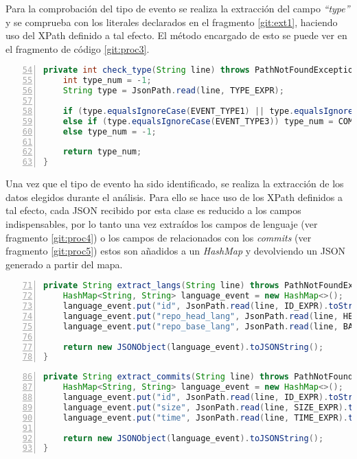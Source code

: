 Para la comprobación del tipo de evento se realiza la extracción del campo \textit{``type''} y se comprueba con los literales declarados en el fragmento \ref{git:ext1}, haciendo uso del \gls{XPath} definido a tal efecto. El método encargado de esto se puede ver en el fragmento de código \ref{git:proc3}.

\clearpage
\begin{lstlisting}[label=git:proc3,language=java,frame=single,caption={Fragmento de la clase \textit{Extractor}. Comprobación de tipo.}, firstnumber=54,numbers=left]
private int check_type(String line) throws PathNotFoundException {
	int type_num = -1;
	String type = JsonPath.read(line, TYPE_EXPR);
	
	if (type.equalsIgnoreCase(EVENT_TYPE1) || type.equalsIgnoreCase(EVENT_TYPE2)) type_num = LANG_TYPE;
	else if (type.equalsIgnoreCase(EVENT_TYPE3)) type_num = COMMIT_TYPE;
	else type_num = -1;
	
	return type_num;
}
\end{lstlisting}

Una vez que el tipo de evento ha sido identificado, se realiza la extracción de los datos elegidos durante el análisis. Para ello se hace uso de los \gls{XPath} definidos a tal efecto, cada \gls{JSON} recibido por esta clase es reducido a los campos indispensables, por lo tanto una vez extraídos los campos de lenguaje (ver fragmento \ref{git:proc4}) o los campos de relacionados con los \textit{commits} (ver fragmento \ref{git:proc5}) estos son añadidos a un \textit{HashMap} y devolviendo un \gls{JSON} generado a partir del mapa.

\begin{lstlisting}[label=git:proc4,language=java,frame=single,caption={Fragmento de la clase \textit{Extractor}. Método de extracción de lenguajes.}, firstnumber=71,numbers=left]
private String extract_langs(String line) throws PathNotFoundException {
	HashMap<String, String> language_event = new HashMap<>();
	language_event.put("id", JsonPath.read(line, ID_EXPR).toString());
	language_event.put("repo_head_lang", JsonPath.read(line, HEAD_EXPR));
	language_event.put("repo_base_lang", JsonPath.read(line, BASE_EXPR));
	
	return new JSONObject(language_event).toJSONString();
}
\end{lstlisting}

\begin{lstlisting}[label=git:proc5,language=java,frame=single,caption={Fragmento de la clase \textit{Extractor}. Método de extacción de \textit{commits}.}, firstnumber=86,numbers=left]
private String extract_commits(String line) throws PathNotFoundException {
	HashMap<String, String> language_event = new HashMap<>();
	language_event.put("id", JsonPath.read(line, ID_EXPR).toString());
	language_event.put("size", JsonPath.read(line, SIZE_EXPR).toString());
	language_event.put("time", JsonPath.read(line, TIME_EXPR).toString().substring(0, 10));
	
	return new JSONObject(language_event).toJSONString();
}
\end{lstlisting}


